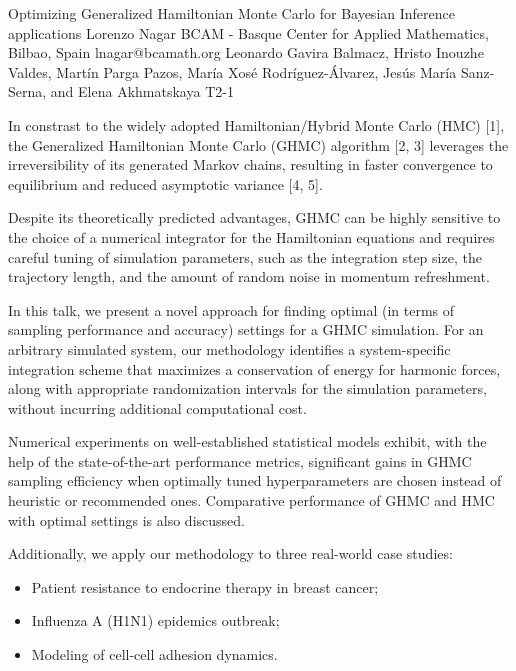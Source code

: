 \begin{talk}
  {Optimizing Generalized Hamiltonian Monte Carlo for Bayesian Inference applications}%
  {Lorenzo Nagar}%
  {BCAM - Basque Center for Applied Mathematics, Bilbao, Spain}%
  {lnagar@bcamath.org}%
  {Leonardo Gavira Balmacz, Hristo Inouzhe Valdes, Mart\'in Parga Pazos, Mar\'ia Xos\'e Rodr\'iguez-\'Alvarez, Jes\'us Mar\'ia Sanz-Serna, and Elena Akhmatskaya}%
  {T2-1}%
			
In constrast to the widely adopted Hamiltonian/Hybrid Monte Carlo (HMC) [1], the Generalized Hamiltonian Monte Carlo (GHMC) algorithm [2, 3] leverages the irreversibility of its generated Markov chains, resulting in faster convergence to equilibrium and reduced asymptotic variance [4, 5]. 

Despite its theoretically predicted advantages, GHMC can be highly sensitive to the choice of a numerical integrator for the Hamiltonian equations and requires careful tuning of simulation parameters, such as the integration step size, the trajectory length, and the amount of random noise in momentum refreshment.

In this talk, we present a novel approach for finding optimal (in terms of sampling performance and accuracy) settings for a GHMC simulation. For an arbitrary simulated system, our methodology identifies a system-specific integration scheme that maximizes a conservation of energy for harmonic forces, along with appropriate randomization intervals for the simulation parameters, without incurring additional computational cost.

Numerical experiments on well-established statistical models exhibit, with the help of the state-of-the-art performance metrics, significant gains in GHMC sampling efficiency when optimally tuned hyperparameters are chosen instead of heuristic or recommended ones. Comparative performance of GHMC and HMC with optimal settings is also discussed. 

Additionally, we apply our methodology to three real-world case studies:
\begin{itemize}
\item Patient resistance to endocrine therapy in breast cancer;
\item Influenza A (H1N1) epidemics outbreak;
\item Modeling of cell-cell adhesion dynamics.
\end{itemize}


\end{talk}
